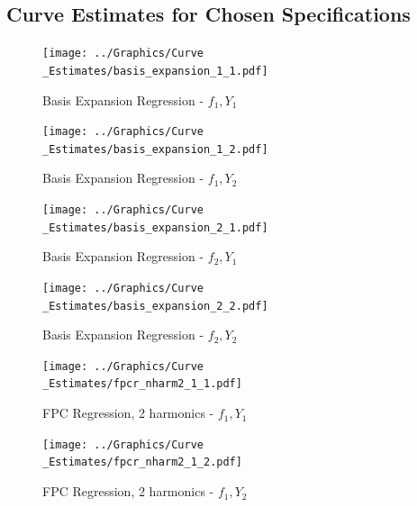 \documentclass[11pt,twoside,a4paper]{article}
\begin{document}
\newpage

	
	\subsection{Curve Estimates for Chosen Specifications}
	
	\begin{figure}[H]
		\centering
		\begin{minipage}{.5\textwidth}
			\centering
			\texttt{[image: ../Graphics/Curve\\\_Estimates/basis\_expansion\_1\_1.pdf]}
			\caption{Basis Expansion Regression - $f_1, Y_1$}
		\end{minipage}%
		\begin{minipage}{.5\textwidth}
			\centering
			\texttt{[image: ../Graphics/Curve\\\_Estimates/basis\_expansion\_1\_2.pdf]}
			\caption{Basis Expansion Regression - $f_1, Y_2$}
		\end{minipage}
	\end{figure}

	\begin{figure}[H]
		\centering
		\begin{minipage}{.5\textwidth}
			\centering
			\texttt{[image: ../Graphics/Curve\\\_Estimates/basis\_expansion\_2\_1.pdf]}
			\caption{Basis Expansion Regression - $f_2, Y_1$}
		\end{minipage}%
		\begin{minipage}{.5\textwidth}
			\centering
			\texttt{[image: ../Graphics/Curve\\\_Estimates/basis\_expansion\_2\_2.pdf]}
			\caption{Basis Expansion Regression - $f_2, Y_2$}
		\end{minipage}
	\end{figure}

	\begin{figure}[H]
		\centering
		\begin{minipage}{.5\textwidth}
			\centering
			\texttt{[image: ../Graphics/Curve\\\_Estimates/fpcr\_nharm2\_1\_1.pdf]}
			\caption{FPC Regression, 2 harmonics - $f_1, Y_1$}
		\end{minipage}%
		\begin{minipage}{.5\textwidth}
			\centering
			\texttt{[image: ../Graphics/Curve\\\_Estimates/fpcr\_nharm2\_1\_2.pdf]}
			\caption{FPC Regression, 2 harmonics - $f_1, Y_2$}
		\end{minipage}
	\end{figure}
	
\end{document}
